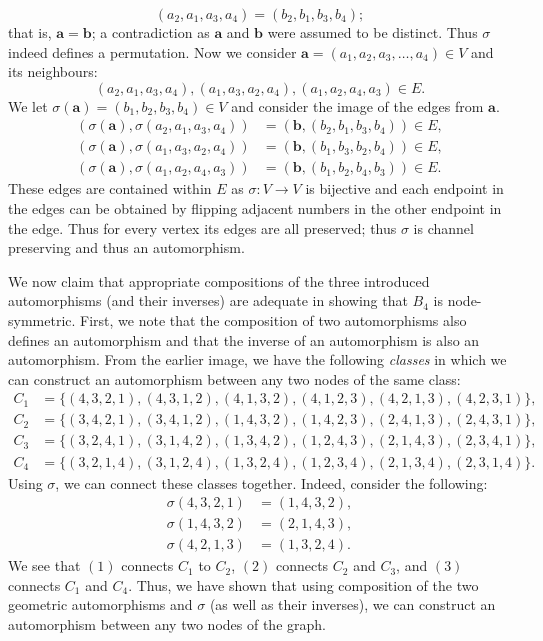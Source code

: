 \begin{parts}
\begin{solution}
      \[ (a_2, a_1, a_3, a_4) = (b_2, b_1, b_3, b_4); \]
      that is, $\bm a = \bm b$; a contradiction as $\bm a$ and $\bm b$ were assumed to be distinct. Thus $\sigma$ indeed defines a permutation. Now we consider $\bm a = (a_1, a_2, a_3, \ldots, a_4) \in V$ and its neighbours:
      \[ (a_2, a_1, a_3, a_4), (a_1, a_3, a_2, a_4), (a_1, a_2, a_4, a_3) \in E. \]
      We let $\sigma(\bm a) = (b_1, b_2, b_3, b_4) \in V$ and consider the image of the edges from $\bm a$.
      \begin{align*}
        (\sigma(\bm a), \sigma(a_2, a_1, a_3, a_4)) &= (\bm b, (b_2, b_1, b_3, b_4)) \in E, \\
        (\sigma(\bm a), \sigma(a_1, a_3, a_2, a_4)) &= (\bm b, (b_1, b_3, b_2, b_4)) \in E, \\
        (\sigma(\bm a), \sigma(a_1, a_2, a_4, a_3)) &= (\bm b, (b_1, b_2, b_4, b_3)) \in E.
      \end{align*}
      These edges are contained within $E$ as $\sigma: V \to V$ is bijective and each endpoint in the edges can be obtained by flipping adjacent numbers in the other endpoint in the edge. 
      Thus for every vertex its edges are all preserved; thus $\sigma$ is channel preserving and thus an automorphism.

      We now claim that appropriate compositions of the three introduced automorphisms (and their inverses) are adequate in showing that $B_4$ is node-symmetric. First, we note that the composition of two automorphisms also defines an automorphism and that the inverse of an automorphism is also an automorphism. From the earlier image, we have the following \emph{classes} in which we can construct an automorphism between any two nodes of the same class:
      \begin{align*}
        C_1 &= \{(4,3,2,1), (4,3,1,2), (4,1,3,2), (4,1,2,3), (4,2,1,3), (4,2,3,1)\}, \\
        C_2 &= \{(3,4,2,1), (3,4,1,2), (1,4,3,2), (1,4,2,3), (2,4,1,3), (2,4,3,1)\}, \\
        C_3 &= \{(3,2,4,1), (3,1,4,2), (1,3,4,2), (1,2,4,3), (2,1,4,3), (2,3,4,1)\}, \\
        C_4 &= \{(3,2,1,4), (3,1,2,4), (1,3,2,4), (1,2,3,4), (2,1,3,4), (2,3,1,4)\}.
      \end{align*}
      Using $\sigma$, we can connect these classes together. Indeed, consider the following:
      \begin{align}
        \sigma(4,3,2,1) &= (1,4,3,2), \\
        \sigma(1,4,3,2) &= (2,1,4,3), \\
        \sigma(4,2,1,3) &= (1,3,2,4).
      \end{align}
      We see that $(1)$ connects $C_1$ to $C_2$, $(2)$ connects $C_2$ and $C_3$, and $(3)$ connects $C_1$ and $C_4$. Thus, we have shown that using composition of the two geometric automorphisms and $\sigma$ (as well as their inverses), we can construct an automorphism between any two nodes of the graph. 
    \end{solution}
  \end{parts}
